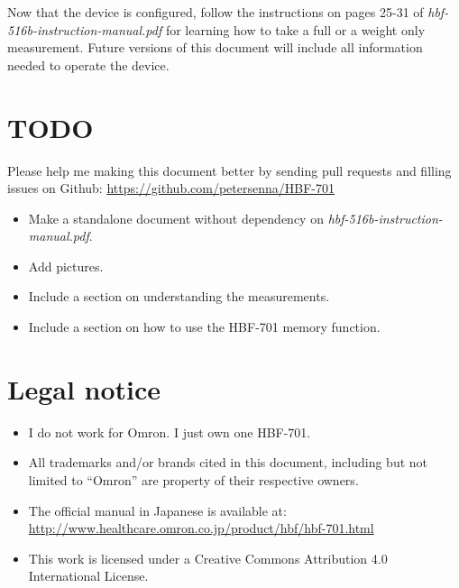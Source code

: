 \documentclass[10pt]{article}
\begin{document}
Now that the device is configured, follow the instructions on pages 25-31 of
\textit{hbf-516b-instruction-manual.pdf} for learning how to take a full or a
weight only measurement. Future versions of this document will include all
information needed to operate the device.

\section{TODO}
\label{sec:todo}
Please help me making this document better by sending pull requests and filling
issues on Github: \url{https://github.com/petersenna/HBF-701}
\begin{itemize}
  \item Make a standalone document without dependency on
	\textit{hbf-516b-instruction-manual.pdf}.
  \item Add pictures.
  \item Include a section on understanding the measurements.
  \item Include a section on how to use the HBF-701 memory function.
\end{itemize}

\section{Legal notice}
\label{sec:legal}
\begin{itemize}
  \item I do not work for Omron. I just own one HBF-701.
  \item All trademarks and/or brands cited in this document, including but not
        limited to ``Omron'' are property of their respective owners.
  \item The official manual in Japanese is available at:
        \url{http://www.healthcare.omron.co.jp/product/hbf/hbf-701.html}
  \item This work is licensed under a Creative Commons Attribution 4.0
        International License.
\end{itemize}
\end{document}
